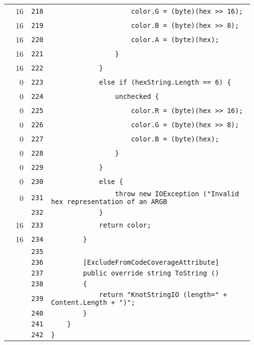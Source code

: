 \documentclass[a4paper,10pt]{article}
\begin{document}
\begin{longtable}[l]{lrrl}
\cellcolor{green} & 16 & \verb~218~ & \verb~                    color.G = (byte)(hex >> 16);~\\
\cellcolor{green} & 16 & \verb~219~ & \verb~                    color.B = (byte)(hex >> 8);~\\
\cellcolor{green} & 16 & \verb~220~ & \verb~                    color.A = (byte)(hex);~\\
\cellcolor{green} & 16 & \verb~221~ & \verb~                }~\\
\cellcolor{green} & 16 & \verb~222~ & \verb~            }~\\
\cellcolor{red} & 0 & \verb~223~ & \verb~            else if (hexString.Length == 6) {~\\
\cellcolor{red} & 0 & \verb~224~ & \verb~                unchecked {~\\
\cellcolor{red} & 0 & \verb~225~ & \verb~                    color.R = (byte)(hex >> 16);~\\
\cellcolor{red} & 0 & \verb~226~ & \verb~                    color.G = (byte)(hex >> 8);~\\
\cellcolor{red} & 0 & \verb~227~ & \verb~                    color.B = (byte)(hex);~\\
\cellcolor{red} & 0 & \verb~228~ & \verb~                }~\\
\cellcolor{red} & 0 & \verb~229~ & \verb~            }~\\
\cellcolor{red} & 0 & \verb~230~ & \verb~            else {~\\
\cellcolor{red} & 0 & \verb~231~ & \verb~                throw new IOException ("Invalid hex representation of an ARGB ~\\
\cellcolor{gray} &  & \verb~232~ & \verb~            }~\\
\cellcolor{green} & 16 & \verb~233~ & \verb~            return color;~\\
\cellcolor{green} & 16 & \verb~234~ & \verb~        }~\\
\cellcolor{gray} &  & \verb~235~ & \verb~~\\
\cellcolor{gray} &  & \verb~236~ & \verb~        [ExcludeFromCodeCoverageAttribute]~\\
\cellcolor{gray} &  & \verb~237~ & \verb~        public override string ToString ()~\\
\cellcolor{gray} &  & \verb~238~ & \verb~        {~\\
\cellcolor{gray} &  & \verb~239~ & \verb~            return "KnotStringIO (length=" + Content.Length + ")";~\\
\cellcolor{gray} &  & \verb~240~ & \verb~        }~\\
\cellcolor{gray} &  & \verb~241~ & \verb~    }~\\
\cellcolor{gray} &  & \verb~242~ & \verb~}~\\
\end{longtable}
\newpage
\end{document}
